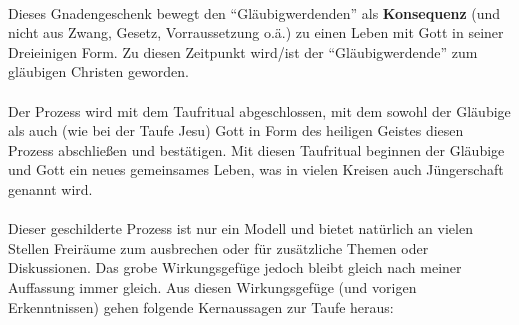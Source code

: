\\
Dieses Gnadengeschenk bewegt den ``Gläubigwerdenden'' als \textbf{Konsequenz} (und nicht aus Zwang, Gesetz, Vorraussetzung o.ä.) zu einen Leben mit Gott in seiner Dreieinigen Form. Zu diesen Zeitpunkt wird/ist der ``Gläubigwerdende'' zum gläubigen Christen geworden.
\\~\\
Der Prozess wird mit dem Taufritual abgeschlossen, mit dem sowohl der Gläubige als auch (wie bei der Taufe Jesu) Gott in Form des heiligen Geistes diesen Prozess abschließen und bestätigen. Mit diesen Taufritual beginnen der Gläubige und Gott ein neues gemeinsames Leben, was in vielen Kreisen auch Jüngerschaft genannt wird.
\\~\\
Dieser geschilderte Prozess ist nur ein Modell und bietet natürlich an vielen Stellen Freiräume zum ausbrechen oder für zusätzliche Themen oder Diskussionen. Das grobe Wirkungsgefüge jedoch bleibt gleich nach meiner Auffassung immer gleich. Aus diesen Wirkungsgefüge (und vorigen Erkenntnissen) gehen folgende Kernaussagen zur Taufe heraus:
